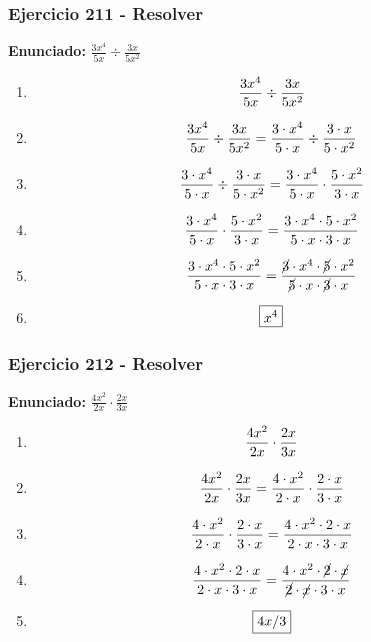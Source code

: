 \documentclass[11pt,a4paper]{article}
\newcommand{\fitmath}[1]{%
\[
\setbox0=\hbox{$\displaystyle #1$}%
\ifdim\wd0>\linewidth
\resizebox{\linewidth}{!}{$\displaystyle #1$}%
\else
#1%
\fi
\]
}
\begin{document}
\vspace{0.12cm}
\subsubsection*{Ejercicio 211 - Resolver}
\textbf{Enunciado:} $ \frac{3 x^{4}}{5 x} \div \frac{3 x}{5 x^{2}} $\par
\begin{enumerate}[leftmargin=2em]
\item \fitmath{\frac{3 x^{4}}{5 x} \div \frac{3 x}{5 x^{2}}}
\item \fitmath{\frac{3 x^{4}}{5 x} \div \frac{3 x}{5 x^{2}}= \frac{3\cdot x^{4}}{5\cdot x} \div \frac{3\cdot x}{5\cdot x^{2}}}
\item \fitmath{\frac{3\cdot x^{4}}{5\cdot x}\div \frac{3\cdot x}{5\cdot x^{2}}= \frac{3\cdot x^{4}}{5\cdot x}\cdot \frac{5\cdot x^{2}}{3\cdot x}}
\item \fitmath{\frac{3\cdot x^{4}}{5\cdot x}\cdot \frac{5\cdot x^{2}}{3\cdot x}= \frac{3\cdot x^{4}\cdot 5\cdot x^{2}}{5\cdot x\cdot 3\cdot x}}
\item \fitmath{\frac{3\cdot x^{4}\cdot 5\cdot x^{2}}{5\cdot x\cdot 3\cdot x}= \frac{\cancel{3}\cdot x^{4}\cdot \cancel{5}\cdot x^{2}}{\cancel{5}\cdot x\cdot \cancel{3}\cdot x}}
\item \fitmath{\boxed{x^{4}}}
\end{enumerate}

\vspace{0.12cm}
\subsubsection*{Ejercicio 212 - Resolver}
\textbf{Enunciado:} $ \frac{4 x^{2}}{2 x} \cdot \frac{2 x}{3 x} $\par
\begin{enumerate}[leftmargin=2em]
\item \fitmath{\frac{4 x^{2}}{2 x} \cdot \frac{2 x}{3 x}}
\item \fitmath{\frac{4 x^{2}}{2 x} \cdot \frac{2 x}{3 x}= \frac{4\cdot x^{2}}{2\cdot x} \cdot \frac{2\cdot x}{3\cdot x}}
\item \fitmath{\frac{4\cdot x^{2}}{2\cdot x}\cdot \frac{2\cdot x}{3\cdot x}= \frac{4\cdot x^{2}\cdot 2\cdot x}{2\cdot x\cdot 3\cdot x}}
\item \fitmath{\frac{4\cdot x^{2}\cdot 2\cdot x}{2\cdot x\cdot 3\cdot x}= \frac{4\cdot x^{2}\cdot \cancel{2}\cdot \cancel{x}}{\cancel{2}\cdot \cancel{x}\cdot 3\cdot x}}
\item \fitmath{\boxed{4 x / 3}}
\end{enumerate}
\end{document}
